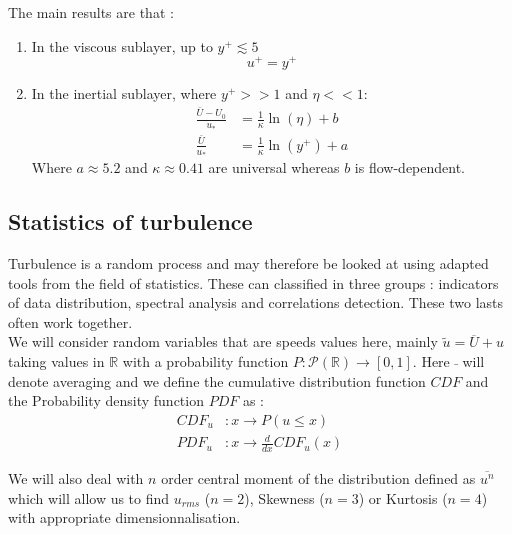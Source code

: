 \documentclass[12pt]{article}
\begin{document}
The main results are that :
\begin{enumerate}
\item In the viscous sublayer, up to $y^+ \lesssim 5$ 
\begin{equation}
    u^+ = y^+
    \label{eq:viscoussublayer}
\end{equation}
\item In the inertial sublayer, where $y^+ >> 1$ and $\eta << 1$:
\begin{align}
    \frac{\bar{U}-U_0}{u_*} &= \frac{1}{\kappa}\ln(\eta) + b \label{eq:inertialsublayer1} \\
    \frac{\bar{U}}{u_*} &= \frac{1}{\kappa} \ln (y^+) + a \label{eq:inertialsublayer2}
\end{align}
Where $a \approx 5.2$ and $\kappa \approx 0.41$ are universal whereas $b$ is flow-dependent.
\end{enumerate}

\subsection{Statistics of turbulence}

Turbulence is a random process and may therefore be looked at using adapted tools from the field of statistics. These can classified in three groups : indicators of data distribution, spectral analysis and correlations detection. These two lasts often work together.\\

We will consider random variables that are speeds values here, mainly $\tilde{u} = \overline{U} + u$ taking values in $\mathbb{R}$ with a probability function $P:\mathcal{P}(\mathbb{R})\rightarrow [0,1]$. Here $\bar{ ~ }$ will denote averaging and we define the cumulative distribution function $CDF$ and the Probability density function $PDF$ as :
\begin{align}
    CDF_u &: x \rightarrow P(u\leq x) \\
    PDF_u &: x \rightarrow \frac{d}{dx}CDF_u (x)
\end{align}

We will also deal with $n$ order central  moment of the distribution defined as $\overline{u^n}$ which will allow us to find $u_{rms}$ ($n=2$), Skewness ($n=3$) or Kurtosis ($n=4$) with appropriate dimensionnalisation. \\
\end{document}
